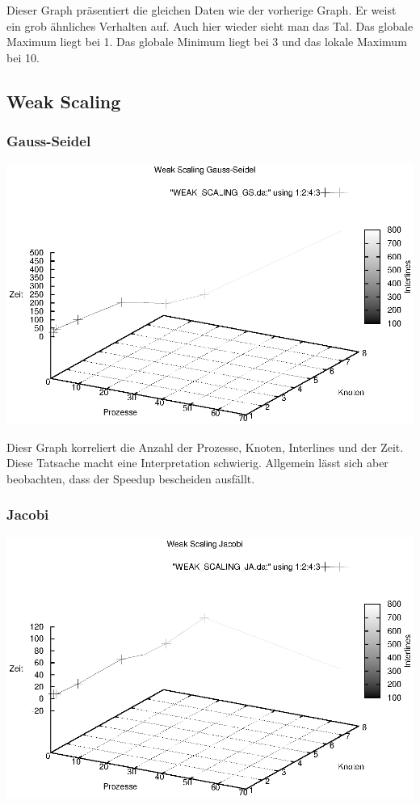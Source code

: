 \documentclass[a4paper,12pt]{scrartcl}
\begin{document}
Dieser Graph präsentiert die gleichen Daten wie der vorherige Graph.
Er weist ein grob ähnliches Verhalten auf. Auch hier wieder sieht man das Tal.
Das globale Maximum liegt bei 1. Das globale Minimum liegt bei 3 und das
lokale Maximum bei 10.

\newpage

\subsection{Weak Scaling}
\subsubsection{Gauss-Seidel}
\begin{multicols}{2}
\includegraphics[scale=0.5]{results/WEAK_SCALING_GS.eps}

\end{multicols}


Diesr Graph korreliert die Anzahl der Prozesse, Knoten, Interlines und der 
Zeit. Diese Tatsache macht eine Interpretation schwierig. Allgemein lässt 
sich aber beobachten, dass der Speedup bescheiden ausfällt.

\subsubsection{Jacobi}
\begin{multicols}{2}
\includegraphics[scale=0.5]{results/WEAK_SCALING_JA.eps}

\end{multicols}
\end{document}
